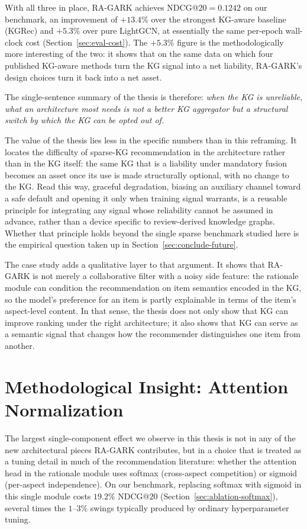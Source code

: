 With all three in place, RA-GARK achieves NDCG@$20 = 0.1242$ on our benchmark, an improvement of $+13.4\%$ over the strongest KG-aware baseline (KGRec) and $+5.3\%$ over pure LightGCN, at essentially the same per-epoch wall-clock cost (Section~\ref{sec:eval-cost}). The $+5.3\%$ figure is the methodologically more interesting of the two: it shows that on the same data on which four published KG-aware methods turn the KG signal into a net liability, RA-GARK's design choices turn it back into a net asset.

The single-sentence summary of the thesis is therefore: \emph{when the KG is unreliable, what an architecture most needs is not a better KG aggregator but a structural switch by which the KG can be opted out of.}

The value of the thesis lies less in the specific numbers than in this reframing. It locates the difficulty of sparse-KG recommendation in the architecture rather than in the KG itself: the same KG that is a liability under mandatory fusion becomes an asset once its use is made structurally optional, with no change to the KG. Read this way, graceful degradation, biasing an auxiliary channel toward a safe default and opening it only when training signal warrants, is a reusable principle for integrating any signal whose reliability cannot be assumed in advance, rather than a device specific to review-derived knowledge graphs. Whether that principle holds beyond the single sparse benchmark studied here is the empirical question taken up in Section~\ref{sec:conclude-future}.

The case study adds a qualitative layer to that argument. It shows that RA-GARK is not merely a collaborative filter with a noisy side feature: the rationale module can condition the recommendation on item semantics encoded in the KG, so the model's preference for an item is partly explainable in terms of the item's aspect-level content. In that sense, the thesis does not only show that KG can improve ranking under the right architecture; it also shows that KG can serve as a semantic signal that changes how the recommender distinguishes one item from another.

\section{Methodological Insight: Attention Normalization}
\label{sec:conclude-insight}

The largest single-component effect we observe in this thesis is not in any of the new architectural pieces RA-GARK contributes, but in a choice that is treated as a tuning detail in much of the recommendation literature: whether the attention head in the rationale module uses softmax (cross-aspect competition) or sigmoid (per-aspect independence). On our benchmark, replacing softmax with sigmoid in this single module costs $19.2\%$ NDCG@$20$ (Section~\ref{sec:ablation-softmax}), several times the $1$--$3\%$ swings typically produced by ordinary hyperparameter tuning.

